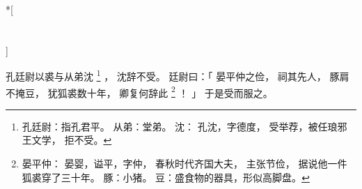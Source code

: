 
\switchcolumn[0]*[\section{}]

孔廷尉以裘与从弟沈%
\footnote{%
    孔廷尉：指孔君平。
    从弟：堂弟。
    沈：
        孔沈，字德度，
        受举荐，被任琅邪王文学，
        拒不受。
}%
，
沈辞不受。
廷尉曰：「
    晏平仲之俭，
    祠其先人，
    豚肩不掩豆，
    犹狐裘数十年，
    卿复何辞此%
    \footnote{%
        晏平仲：
            晏婴，谥平，字仲，
            春秋时代齐国大夫，
            主张节俭，
            据说他一件狐裘穿了三十年。
        豚：小猪。
        豆：盛食物的器具，形似高脚盘。
    }%
    ！
」
于是受而服之。

\switchcolumn


